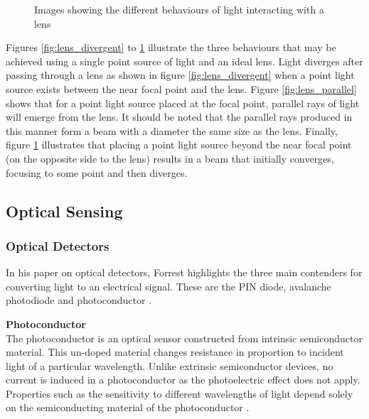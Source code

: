 \begin{figure}[H]
\begin{minipage}{.3\textwidth}
		\label{fig:lens_convergent}
	\end{minipage}
	\caption*{Images showing the different behaviours of light interacting with a lens\footnotemark}
\end{figure}


Figures \ref{fig:lens_divergent} to \ref{fig:lens_convergent} illustrate the three behaviours that may be achieved using a single point source of light and an ideal lens. Light diverges after passing through a lens as shown in figure \ref{fig:lens_divergent} when a point light source exists between the near focal point and the lens. Figure \ref{fig:lens_parallel} shows that for a point light source placed at the focal point, parallel rays of light will emerge from the lens. It should be noted that the parallel rays produced in this manner form a beam with a diameter the same size as the lens. Finally, figure \ref{fig:lens_convergent} illustrates that placing a point light source beyond the near focal point (on the opposite side to the lens) results in a beam that initially converges, focusing to some point and then diverges.

\subsection{Optical Sensing}
\label{sec:optical_sensing}

\subsubsection{Optical Detectors}
In his paper on optical detectors, Forrest highlights the three main contenders for converting light to an electrical signal. These are the PIN diode, avalanche photodiode and photoconductor \cite{Forrest1986}.

\textbf{Photoconductor}\\
The photoconductor is an optical sensor constructed from intrinsic semiconductor material. This un-doped material changes resistance in proportion to incident light of a particular wavelength. Unlike extrinsic semiconductor devices, no current is induced in a photoconductor as the photoelectric effect does not apply. Properties such as the sensitivity to different wavelengths of light depend solely on the semiconducting material of the photoconductor \cite{Kingston2003}.

